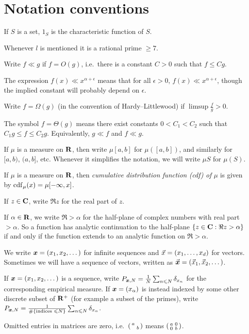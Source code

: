 \section{Notation conventions}

If $S$ is a set, $1_S$ is the characteristic function of $S$. 

Whenever $l$ is mentioned it is a rational prime $\geqslant 7$. 

Write $f\ll g$ if $f = O(g)$, i.e.~there is a constant $C>0$ such that 
$f \leqslant C g$. 

The expression $f(x) \ll x^{\alpha+\epsilon}$ means that for all $\epsilon>0$, 
$f(x) \ll x^{\alpha+\epsilon}$, though the implied constant will probably 
depend on $\epsilon$. 

Write $f=\Omega(g)$ (in the convention of Hardy--Littlewood) if 
$\limsup \frac f g > 0$. 

The symbol $f = \Theta(g)$ means there exist constants $0<C_1<C_2$ such that 
$C_1 g \leqslant f \leqslant C_2 g$. Equivalently, $g \ll f$ and $f \ll g$. 

If $\mu$ is a measure on $\mathbf{R}$, then write $\mu[a,b]$ for $\mu([a,b])$, and 
similarly for $[a,b)$, $(a,b]$, etc. Whenever it simplifies the 
notation, we will write $\mu S$ for $\mu(S)$. 

If $\mu$ is a measure on $\mathbf{R}$, then \emph{cumulative distribution function 
(cdf) of $\mu$} is given by $\operatorname{cdf}_\mu(x) = \mu[-\infty,x]$. 

If $z\in \mathbf{C}$, write $\Re z$ for the real part of $z$. 

If $\alpha\in \mathbf{R}$, we write $\Re > \alpha$ for the half-plane of complex 
numbers with real part $> \alpha$. So a function has analytic continuation to 
the half-plane $\{z\in \mathbf{C} : \Re z > \alpha\}$ if and only if the function 
extends to an analytic function on $\Re > \alpha$. 

We write ${\boldsymbol x} = (x_1,x_2,\dots)$ for infinite sequences and 
$\vec{x} = (x_1,\dots,x_d)$ for vectors. Sometimes we will have a sequence of 
vectors, written as $\vec{\boldsymbol x} = (\vec{x}_1,\vec{x}_2,\dots)$. 

If ${\boldsymbol x}=(x_1,x_2,\dots)$ is a sequence, write 
$P_{{\boldsymbol x},N} = \frac{1}{N} \sum_{n\leqslant N} \delta_{x_n}$ for the 
corresponding empirical measure. If ${\boldsymbol x}=(x_\alpha)$ is instead indexed by 
some other discrete subset of $\mathbf{R}^+$ (for example a subset of the primes), 
write 
$P_{{\boldsymbol x},N} = \frac{1}{\# \{\text{indices }\leqslant N\}}\sum_{\alpha \leqslant N} \delta_{x_\alpha}$. 

Omitted entries in matrices are zero, i.e.~$\left(\begin{smallmatrix} a &  \\  & b \end{smallmatrix}\right)$ means 
$\left(\begin{smallmatrix} a & 0 \\ 0 & b \end{smallmatrix}\right)$. 
